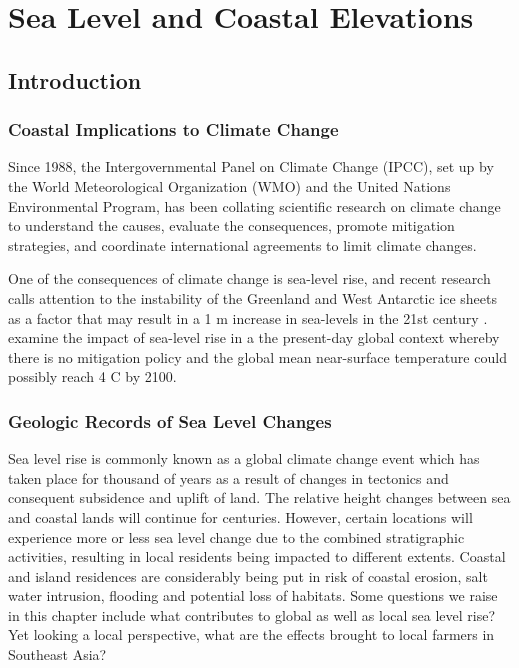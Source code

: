 \chapter{Sea Level and Coastal Elevations}\label{ch:subsidence}

\section{Introduction}

\subsection{Coastal Implications to Climate Change}

Since 1988, the Intergovernmental Panel on Climate Change (IPCC), set up by the World Meteorological Organization (WMO) and the United Nations Environmental Program, has been collating scientific research on climate change to understand the causes, evaluate the consequences, promote mitigation strategies, and coordinate international agreements to limit climate changes. 

One of the consequences of climate change is sea-level rise, and recent research calls attention to the instability of the Greenland and West Antarctic ice sheets as a factor that may result in a 1 m increase in sea-levels in the 21st century \citep{nicholls2010sea}. \citet{nicholls2010sea} examine the impact of sea-level rise in a the present-day global context whereby there is no mitigation policy and the global mean near-surface temperature could possibly reach 4 \degree C by 2100.

\subsection{Geologic Records of Sea Level Changes}
  
Sea level rise is commonly known as a global climate change event which has taken place for thousand of years as a result of changes in tectonics and consequent subsidence and uplift of  land. The relative height changes between sea and coastal lands will continue for centuries. However, certain locations will experience more or less sea level change due to the combined stratigraphic activities, resulting in local residents being impacted to different extents. Coastal and island residences are considerably being put in risk of coastal erosion, salt water intrusion, flooding and potential loss of habitats. Some questions we raise in this chapter include what contributes to global as well as local sea level rise?  Yet looking a local perspective, what are the effects brought to local farmers in Southeast Asia?

